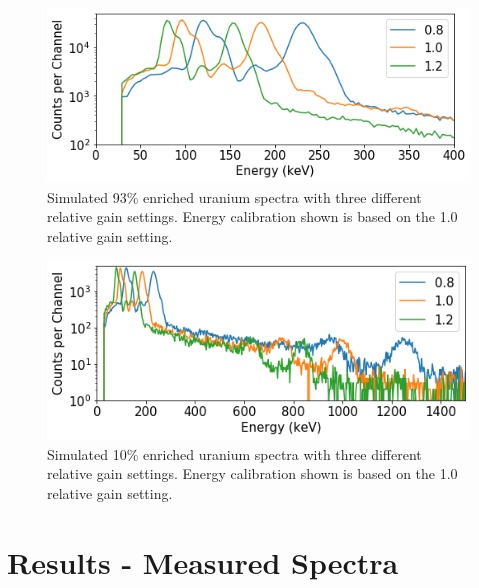 \begin{figure}[H]
	\centering
	\includegraphics[width=0.8\linewidth]{images/simulated_uranium_calibration.png}
	\caption{Simulated 93\% enriched uranium spectra with three different relative gain settings. Energy calibration shown is based on the 1.0 relative gain setting.}
	\label{fig:simulated_uranium_calibration_93pct}
\end{figure}

\begin{figure}[H]
	\centering
	\includegraphics[width=0.8\linewidth]{images/simulated_uranium_calibration_1500kev.png}
	\caption{Simulated 10\% enriched uranium spectra with three different relative gain settings. Energy calibration shown is based on the 1.0 relative gain setting.}
	\label{fig:simulated_uranium_calibration_10pct}
\end{figure}

\section{Results - Measured Spectra}






